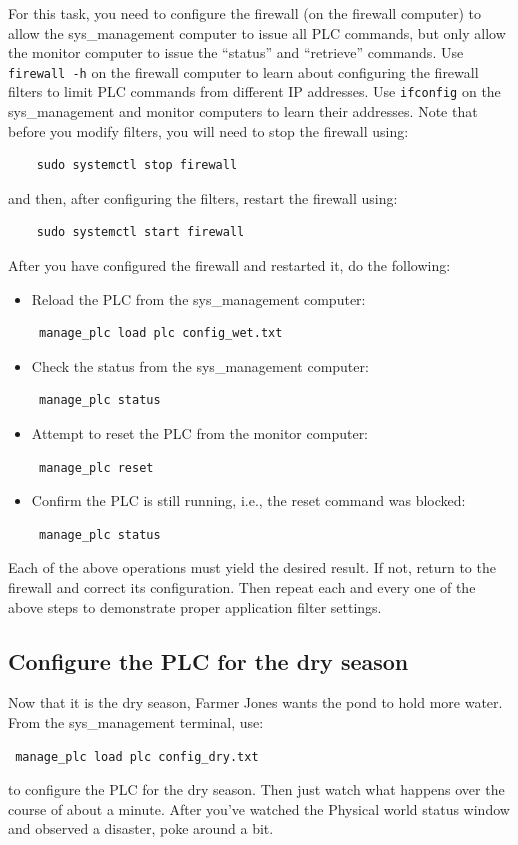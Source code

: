 For this task, you need to configure the firewall (on the firewall computer) to allow the sys\_management computer
to issue all PLC commands, but only allow the monitor computer to issue the ``status'' and ``retrieve'' commands.
Use {\tt firewall -h} on the firewall computer to learn about configuring the firewall filters to limit PLC commands from different
IP addresses.  Use {\tt ifconfig} on the sys\_management and monitor computers to learn their addresses.  Note
that before you modify filters, you will need to stop the firewall using:
\begin{verbatim}
    sudo systemctl stop firewall
\end{verbatim}
and then, after configuring the filters, restart the firewall using:
\begin{verbatim}
    sudo systemctl start firewall
\end{verbatim}

After you have configured the firewall and restarted it, do the following:
\begin{itemize}
\item Reload the PLC from the sys\_management computer:
\begin{verbatim}
 manage_plc load plc config_wet.txt
\end{verbatim}

\item Check the status from the sys\_management computer:
\begin{verbatim}
 manage_plc status
\end{verbatim}

\item Attempt to reset the PLC from the monitor computer:
\begin{verbatim}
 manage_plc reset
\end{verbatim}

\item Confirm the PLC is still running, i.e., the reset command was blocked:
\begin{verbatim}
 manage_plc status
\end{verbatim}
\end{itemize}

Each of the above operations must yield the desired result.  If not, return to the firewall and correct its configuration.
Then repeat each and every one of the above steps to demonstrate proper application filter settings.

\subsection{Configure the PLC for the dry season}
Now that it is the dry season, Farmer Jones wants the pond to hold more water.
From the sys\_management terminal, use:
\begin{verbatim}
 manage_plc load plc config_dry.txt
\end{verbatim}
\noindent to configure the PLC for the dry season.
Then just watch what happens over the course of about a minute.
After you've watched the Physical world status window and observed a disaster, poke around a bit.

